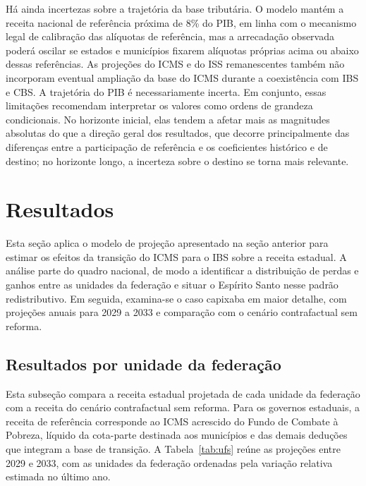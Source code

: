 \documentclass[12pt,a4paper]{article}
\begin{document}
Há ainda incertezas sobre a trajetória da base tributária. O modelo mantém a receita nacional de referência próxima de 8\% do PIB, em linha com o mecanismo legal de calibração das alíquotas de referência, mas a arrecadação observada poderá oscilar se estados e municípios fixarem alíquotas próprias acima ou abaixo dessas referências. As projeções do ICMS e do ISS remanescentes também não incorporam eventual ampliação da base do ICMS durante a coexistência com IBS e CBS. A trajetória do PIB é necessariamente incerta. Em conjunto, essas limitações recomendam interpretar os valores como ordens de grandeza condicionais. No horizonte inicial, elas tendem a afetar mais as magnitudes absolutas do que a direção geral dos resultados, que decorre principalmente das diferenças entre a participação de referência e os coeficientes histórico e de destino; no horizonte longo, a incerteza sobre o destino se torna mais relevante.

\section{Resultados}\label{sec:result}

Esta seção aplica o modelo de projeção apresentado na seção anterior para estimar os efeitos da transição do ICMS para o IBS sobre a receita estadual. A análise parte do quadro nacional, de modo a identificar a distribuição de perdas e ganhos entre as unidades da federação e situar o Espírito Santo nesse padrão redistributivo. Em seguida, examina-se o caso capixaba em maior detalhe, com projeções anuais para 2029 a 2033 e comparação com o cenário contrafactual sem reforma.

\subsection{Resultados por unidade da federação}

Esta subseção compara a receita estadual projetada de cada unidade da federação com a receita do cenário contrafactual sem reforma. Para os governos estaduais, a receita de referência corresponde ao ICMS acrescido do Fundo de Combate à Pobreza, líquido da cota-parte destinada aos municípios e das demais deduções que integram a base de transição. A Tabela~\ref{tab:ufs} reúne as projeções entre 2029 e 2033, com as unidades da federação ordenadas pela variação relativa estimada no último ano.
\end{document}
